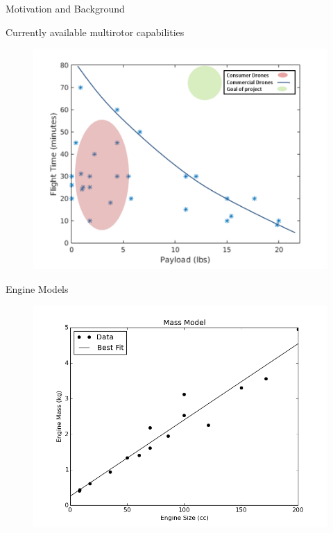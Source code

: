\documentclass{beamer}
\begin{document}
\begin{frame}{Motivation and Background}
	\begin{center}
	Currently available multirotor capabilities
	\end{center}
	\begin{figure}
		\begin{center}
			\includegraphics[width=.70\textwidth]{current_rev.png}
			\label{current_capabilities}
		\end{center}
	\end{figure}
\end{frame}

\begin{frame}{Engine Models}

	\begin{figure}
		\begin{center}
			\includegraphics[width=.70\textwidth]{../mass.png}
			\label{fig:eng_mass}
		\end{center}
	\end{figure}
\end{frame}
\end{document}
